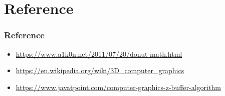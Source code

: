 \documentclass[12pt, t]{beamer}
\begin{document}

\section{Reference}
\begin{frame}
    \frametitle{Reference}

    \small{
        \begin{itemize}
            \item \url{https://www.a1k0n.net/2011/07/20/donut-math.html}
            \item \url{https://en.wikipedia.org/wiki/3D_computer_graphics}
            \item \url{https://www.javatpoint.com/computer-graphics-z-buffer-algorithm}
        \end{itemize}
    }
    
\end{frame}
\end{document}

